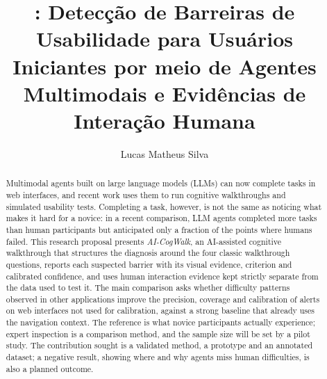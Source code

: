 \documentclass[12pt]{article}
\title{\proj: Detecção de Barreiras de Usabilidade para Usuários Iniciantes por meio de Agentes Multimodais e Evidências de Interação Humana}
\author{Lucas Matheus Silva\inst{1}}
\newcommand{\proj}{AI-CogWalk}
\begin{document}
\maketitle
\sloppy

\begin{abstract}
Multimodal agents built on large language models (LLMs) can now complete tasks in web interfaces, and recent work uses them to run cognitive walkthroughs and simulated usability tests. Completing a task, however, is not the same as noticing what makes it hard for a novice: in a recent comparison, LLM agents completed more tasks than human participants but anticipated only a fraction of the points where humans failed. This research proposal presents \textit{\proj}, an AI-assisted cognitive walkthrough that structures the diagnosis around the four classic walkthrough questions, reports each suspected barrier with its visual evidence, criterion and calibrated confidence, and uses human interaction evidence kept strictly separate from the data used to test it. The main comparison asks whether difficulty patterns observed in other applications improve the precision, coverage and calibration of alerts on web interfaces not used for calibration, against a strong baseline that already uses the navigation context. The reference is what novice participants actually experience; expert inspection is a comparison method, and the sample size will be set by a pilot study. The contribution sought is a validated method, a prototype and an annotated dataset; a negative result, showing where and why agents miss human difficulties, is also a planned outcome.
\end{abstract}
\end{document}
